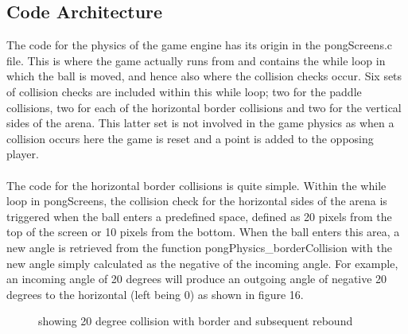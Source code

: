 \documentclass[a4paper,12pt]{article}
\begin{document}
\begin{flushleft}
\subsection{Code Architecture}
The code for the physics of the game engine has its origin in the pongScreens.c file. This is where the game actually runs from and contains the while loop in which the ball is moved, and hence also where the collision checks occur. Six sets of collision checks are included within this while loop; two for the paddle collisions, two for each of the horizontal border collisions and two for the vertical sides of the arena. This latter set is not involved in the game physics as when a collision occurs here the game is reset and a point is added to the opposing player. 
\\ \- \\
The code for the horizontal border collisions is quite simple. Within the while loop in pongScreens, the collision check for the horizontal sides of the arena is triggered when the ball enters a predefined space, defined as 20 pixels from the top of the screen or 10 pixels from the bottom. When the ball enters this area, a new angle is retrieved from the function pongPhysics\_borderCollision with the new angle simply calculated as the negative of the incoming angle. For example, an incoming angle of 20 degrees will produce an outgoing angle of negative 20 degrees to the horizontal (left being 0) as shown in figure 16.
\begin{figure}[H]
  \centering
  \caption{showing 20 degree collision with border and subsequent rebound}
\end{figure}
\- \\

\end{flushleft}
\end{document}
